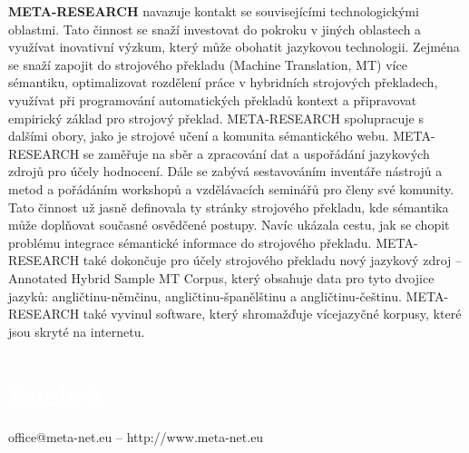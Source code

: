 \begin{multicols}{2}
\textbf{META-RESEARCH} navazuje kontakt se souvisejícími technologickými oblastmi. Tato činnost se snaží investovat do pokroku v jiných oblastech a využívat inovativní výzkum, který může obohatit jazykovou technologii. Zejména se snaží zapojit do strojového překladu (Machine Translation, MT) více sémantiku, optimalizovat rozdělení práce v hybridních strojových překladech, využívat při programování automatických překladů kontext a připravovat empirický základ pro strojový překlad. META-RESEARCH spolupracuje s dalšími obory, jako je strojové učení a komunita sémantického webu. META-RESEARCH se zaměřuje na sběr a zpracování dat a uspořádání jazykových zdrojů pro účely hodnocení. Dále se zabývá sestavováním inventáře nástrojů a metod a pořádáním workshopů a vzdělávacích seminářů pro členy své komunity. Tato činnost už jasně definovala ty stránky strojového překladu, kde sémantika může doplňovat současné osvědčené postupy. Navíc ukázala cestu, jak se chopit problému integrace sémantické informace do strojového překladu. META-RESEARCH také dokončuje pro účely strojového překladu nový jazykový zdroj – Annotated Hybrid Sample MT Corpus, který obsahuje data pro tyto dvojice jazyků: angličtinu-němčinu, angličtinu-španělštinu a angličtinu-češtinu. META-RESEARCH také vyvinul software, který shromažďuje vícejazyčné korpusy, které jsou skryté na internetu.

\end{multicols}


\vfill

\makeatletter
{}
{
  \renewcommand*{\theHsection}{\thepart.\thesection}
}
\makeatother
\part*{\textcolor{white}{English}}
\setcounter{section}{0}
\setcounter{figure}{0}

\centerline{office@meta-net.eu -- http://www.meta-net.eu}



\cleardoublepage

  
